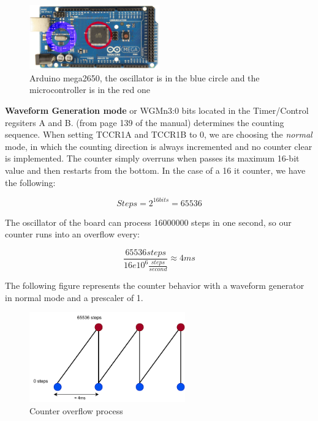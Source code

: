 \documentclass[a4paper]{article}
\begin{document}
\begin{figure}[h!]
	\centering
	\includegraphics[width=0.5\textwidth]{arduino_mega.png}
	\caption{Arduino mega2650, the oscillator is in the blue circle and the microcontroller is in the red one}
	\label{fig:arduino_mega}
\end{figure}

\textbf{Waveform Generation mode} or WGMn3:0 bits located in the Timer/Control regsiters A and B. (from page 139 of the manual) determines the counting sequence. When setting TCCR1A and TCCR1B to 0, we are choosing the \textit{normal} mode, in which the counting direction is always incremented and no counter clear is implemented.  The counter simply overruns when passes its maximum 16-bit value and then restarts from the bottom. In the case of a 16 it counter, we have the following:

\begin{equation}
	Steps = 2^{16bits} = 65536
\end{equation}

The oscillator of the board can process 16000000 steps in one second, so our counter runs into an overflow every:

\begin{equation}
	\frac{65536 steps}{16e10^{6}\frac{steps}{second}} \approx 4ms
\end{equation}

The following figure represents the counter behavior with a waveform generator in normal mode and a prescaler of 1.

\begin{figure}[h!]
	\centering
	\includegraphics[width=0.6\textwidth]{Counter.pdf}
	\caption{Counter overflow process}
	\label{fig:counter}
\end{figure}
\end{document}
